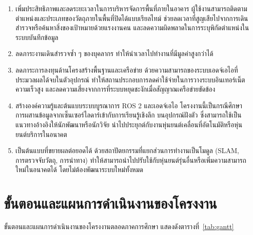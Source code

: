 \documentclass[a4paper,12pt]{report}
\begin{document}
\begin{enumerate}[label=\arabic*., leftmargin=1.25cm, itemsep=6pt, topsep=6pt]
    \item เพิ่มประสิทธิภาพและลดระยะเวลาในการบริหารจัดการพื้นที่ภายในอาคาร
    ผู้ใช้งานสามารถติดตามตำแหน่งและประเภทของวัตถุภายในพื้นที่ปิดได้แบบเรียลไทม์
    ช่วยลดเวลาที่สูญเสียไปจากการเดินสำรวจหรือค้นหาสิ่งของเป้าหมายด้วยแรงงานคน
    และลดความผิดพลาดในการระบุพิกัดตำแหน่งในระบบบันทึกข้อมูล

    \item ลดภาระงานเดินสำรวจซ้ำ ๆ ของบุคลากร
    ทำให้นำเวลาไปทำงานที่มีมูลค่าสูงกว่าได้

    \item ลดภาระการลงทุนด้านโครงสร้างพื้นฐานและเครือข่าย
    ด้วยความสามารถของระบบเอดจ์เอไอที่ประมวลผลได้จบในตัวอุปกรณ์
    ทำให้สถานประกอบการลดค่าใช้จ่ายในการวางระบบอินเทอร์เน็ตความเร็วสูง
    และลดความเสี่ยงจากการที่ระบบหยุดชะงักเมื่อสัญญาณเครือข่ายขัดข้อง

    \item สร้างองค์ความรู้และต้นแบบระบบบูรณาการ ROS 2 และเอดจ์เอไอ
    โครงงานนี้เป็นกรณีศึกษาการผสานข้อมูลจากเซ็นเซอร์ไลดาร์เข้ากับการเรียนรู้เชิงลึก
    บนอุปกรณ์ฝังตัว ซึ่งสามารถใช้เป็นแนวทางอ้างอิงให้นักพัฒนาหรือนักวิจัย
    นำไปประยุกต์กับงานหุ่นยนต์เคลื่อนที่อัตโนมัติหรือหุ่นยนต์บริการในอนาคต

    \item เป็นต้นแบบที่ขยายผลต่อยอดได้
    ด้วยสถาปัตยกรรมที่แยกส่วนการทำงานเป็นโมดูล
    (SLAM, การตรวจจับวัตถุ, การนำทาง)
    ทำให้สามารถนำไปปรับใช้กับหุ่นยนต์รุ่นอื่นหรือเพิ่มความสามารถใหม่ในอนาคตได้
    โดยไม่ต้องพัฒนาระบบใหม่ทั้งหมด
\end{enumerate}

\section{ขั้นตอนและแผนการดำเนินงานของโครงงาน}

ขั้นตอนและแผนการดำเนินงานของโครงงานตลอดภาคการศึกษา
แสดงดังตารางที่~\ref{tab:gantt}
\end{document}
